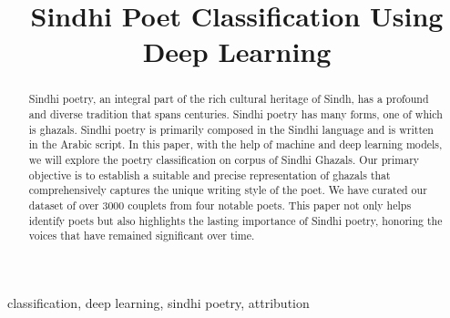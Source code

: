 \documentclass[conference]{IEEEtran}
\begin{document}
\title{Sindhi Poet Classification Using Deep Learning\\
}

\author{
\and
{}
\and
{}
}

\maketitle

\begin{abstract}
Sindhi poetry, an integral part of the rich cultural heritage of Sindh, has a profound and diverse tradition that spans centuries. Sindhi poetry has many forms, one of which is ghazals. Sindhi poetry is primarily composed in the Sindhi language and is written in the Arabic script. In this paper, with the help of machine and deep learning models, we will explore the poetry classification on corpus of Sindhi Ghazals. Our primary objective is to establish a suitable and precise representation of ghazals that comprehensively captures the unique writing style of the poet. We have curated our dataset of over 3000 couplets from four notable poets. This paper not only helps identify poets but also highlights the lasting importance of Sindhi poetry, honoring the voices that have remained significant over time.
\end{abstract}

\begin{IEEEkeywords}
classification, deep learning, sindhi poetry, attribution
\end{IEEEkeywords}
\end{document}
